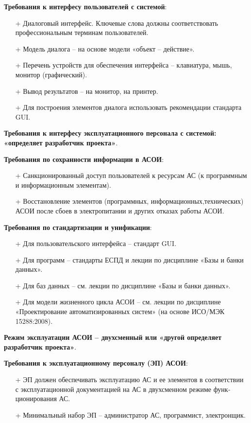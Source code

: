 \documentclass[12pt, a4paper, simple]{eskdtext}
\begin{document}
    \textbf{Требования к интерфесу пользователей с системой}:
    \begin{itemize}
        \item[+] Диалоговый интерфейс. Ключевые слова должны соответствовать профессиональным терминам пользователей.
        \item[+] Модель диалога – на основе модели «объект – действие».
        \item[+] Перечень устройств для обеспечения интерфейса – клавиатура, мышь, монитор (графический).
        \item[+] Вывод результатов – на монитор, на принтер.
        \item[+] Для построения элементов диалога использовать рекомендации  стандарта GUI.
    \end{itemize}

    \textbf{Требования к интерфесу эксплуатационного персонала с системой: «определяет разработчик проекта»}.

    \textbf{Требования по сохранности информации в АСОИ}:
    \begin{itemize}
        \item[+] Санкционированный доступ пользователей к ресурсам АС (к  программным и информационным элементам). 
        \item[+] Восстановление элементов (программных, информационных,технических) АСОИ после сбоев в электропитании и других отказах работы АСОИ.
    \end{itemize}

    \textbf{Требования по стандартизации и унификации}: 
    \begin{itemize}
        \item[+] Для пользовательского интерфейса – стандарт GUI.
        \item[+] Для программ – стандарты ЕСПД и лекции по дисциплине «Базы и банки данных».
        \item[+] Для баз данных – см. лекции по дисциплине «Базы и банки данных».
        \item[+] Для модели жизненного цикла АСОИ – см. лекции по дисциплине «Проектирование автоматизирован­ных систем» (на основе ИСО/МЭК 15288:2008).
    \end{itemize}

    \textbf{Режим эксплуатации АСОИ – двухсменный или «другой определяет разработчик проекта»}.
  
    \textbf{Требования к эксплуатационному персоналу (ЭП) АСОИ}: 
    \begin{itemize}
        \item[+] ЭП должен обеспечивать эксплуатацию АС и ее элементов в соответствии с эксплуатационной до­кумен­тацией на АС в двухсменном режиме функ­циониро­вания АС.
        \item[+] Минимальный набор ЭП – администратор АС, программист, электронщик.
    \end{itemize}
\end{document}
